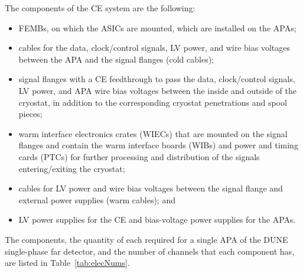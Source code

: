 The components of the CE system are the following:
\begin{itemize}
\item{FEMBs, on which the ASICs are mounted, which are installed on the APAs;}
\item{cables for the data, clock/control signals, LV power, and wire bias voltages between the APA and the signal flanges (cold cables);}
\item{signal flanges with a CE feedthrough to pass the data, clock/control signals, LV power, and APA wire bias voltages between the inside and outside of the cryostat, in addition to the corresponding cryostat penetrations and spool pieces;}
\item{warm interface electronics crates (WIECs) that are mounted on the signal flanges and contain
the warm interface boards (WIBs) and power and timing cards (PTCs) for further processing
and distribution of the signals entering/exiting the cryostat;}
\item{cables for LV power and wire bias voltages between the signal flange and external power
supplies (warm cables); and}
\item{LV power supplies for the CE and bias-voltage power supplies for the APAs.}
\end{itemize}

The components, the quantity of each required for a single APA of the DUNE single-phase far detector, and the number of channels that each component has, are listed in Table~\ref{tab:elecNums}.

